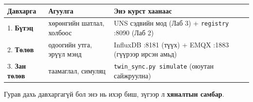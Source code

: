 \begingroup\scriptsize\begin{longtable}[]{@{}lll@{}}
\toprule
\begin{minipage}[b]{0.30\columnwidth}\raggedright
Давхарга\strut
\end{minipage} & \begin{minipage}[b]{0.30\columnwidth}\raggedright
Агуулга\strut
\end{minipage} & \begin{minipage}[b]{0.30\columnwidth}\raggedright
Энэ курст хаанаас\strut
\end{minipage}\tabularnewline
\midrule
\endhead
\begin{minipage}[t]{0.30\columnwidth}\raggedright
1. \textbf{Бүтэц}\strut
\end{minipage} & \begin{minipage}[t]{0.30\columnwidth}\raggedright
хөрөнгийн шатлал, холбоос\strut
\end{minipage} & \begin{minipage}[t]{0.30\columnwidth}\raggedright
UNS сэдвийн мод (Лаб 3) + \texttt{registry} :8090 (Лаб 2)\strut
\end{minipage}\tabularnewline
\begin{minipage}[t]{0.30\columnwidth}\raggedright
2. \textbf{Төлөв}\strut
\end{minipage} & \begin{minipage}[t]{0.30\columnwidth}\raggedright
одоогийн утга, эрүүл мэнд\strut
\end{minipage} & \begin{minipage}[t]{0.30\columnwidth}\raggedright
InfluxDB :8181 (түүх) + EMQX :1883 (гүүрээр ирсэн амьд)\strut
\end{minipage}\tabularnewline
\begin{minipage}[t]{0.30\columnwidth}\raggedright
3. \textbf{Зан төлөв}\strut
\end{minipage} & \begin{minipage}[t]{0.30\columnwidth}\raggedright
таамаглал, симуляц\strut
\end{minipage} & \begin{minipage}[t]{0.30\columnwidth}\raggedright
\texttt{twin\_\allowbreak{}sync.\allowbreak{}py\ simulate} (оюутан сайжруулна)\strut
\end{minipage}\tabularnewline
\bottomrule
\end{longtable}\endgroup

Гурав дахь давхаргагүй бол энэ нь ихэр биш, зүгээр л \textbf{хяналтын самбар}.

